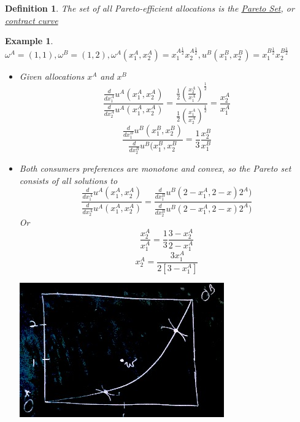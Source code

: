 \documentclass[twoside]{article}
\newtheorem{ex}[theorem]{Example}
\newtheorem{definition}[theorem]{Definition}
\begin{document}
\begin{definition}
The set of all Pareto-efficient allocations is the \underline{Pareto Set}, or \underline{contract curve}
\end{definition}
\newpage
\begin{ex} \(\omega^A = (1, 1), \omega^B = (1, 2), \omega^A(x^A_1, x^A_2) = x_1^{A \frac{1}{2}} x_2^{A \frac{1}{2}}, u^B(x_1^B, x_2^B) = x_1^{B \frac{1}{2}} x_2^{B \frac{1}{2}} \)
\begin{itemize}
\item Given allocations \(x^A\) and \(x^B\)
\[\frac{\frac{d}{dx_1^{A}} u^A(x_1^A, x_2^A)}{\frac{d}{dx_2^A} u^A(x_1^A, x_2^A)} = \frac{\frac{1}{2} \left(\frac{x_2^A}{x_1^A}\right)^\frac{1}{2}}{\frac{1}{2} \left(\frac{x_1^A}{x_2^A}\right)^\frac{1}{2}} = \frac{x_2^A}{x_1^A}\]
\[ \frac{\frac{d}{dx_1^B} u^B(x_1^B, x_2^B)}{\frac{d}{dx_2^B} u^B(x_1^B, x_2^B} = \frac{1}{3} \frac{x_2^B}{x_1^B}\]
\item Both consumers preferences are monotone and convex, so the Pareto set consists of all solutions to 
\[\frac{\frac{d}{dx_1^{A}} u^A(x_1^A, x_2^A)}{\frac{d}{dx_2^A} u^A(x_1^A, x_2^A)} = \frac{\frac{d}{dx_1^B} u^B(2-x_1^A, 2-x)2^A)}{\frac{d}{dx_2^B} u^B(2-x_1^A, 2-x)2^A)}\]
Or 
\[\frac{x_2^A}{x_1^A} = \frac{1}{3} \frac{3-x_2^A}{2-x_1^A}\]
\[x_2^A = \frac{3x_1^A}{2[3-x_1^A]}\]
\begin{center}
\includegraphics[scale=0.5]{24}
\end{center}
\end{itemize}
\end{ex} 
\end{document}
